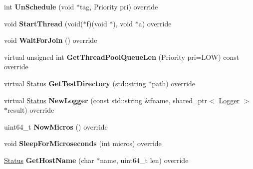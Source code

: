 \begin{DoxyCompactItemize}
\item 
int {\bfseries Un\+Schedule} (void $\ast$tag, Priority pri) override\hypertarget{classrocksdb_1_1EnvWrapper_ae8d7a993c3d59951738942283241b76f}{}\label{classrocksdb_1_1EnvWrapper_ae8d7a993c3d59951738942283241b76f}

\item 
void {\bfseries Start\+Thread} (void($\ast$f)(void $\ast$), void $\ast$a) override\hypertarget{classrocksdb_1_1EnvWrapper_aca39b00f12a10b25a29cf80bc877bcd7}{}\label{classrocksdb_1_1EnvWrapper_aca39b00f12a10b25a29cf80bc877bcd7}

\item 
void {\bfseries Wait\+For\+Join} () override\hypertarget{classrocksdb_1_1EnvWrapper_aeb73bcae1e862c28c1facf89c6bdc004}{}\label{classrocksdb_1_1EnvWrapper_aeb73bcae1e862c28c1facf89c6bdc004}

\item 
virtual unsigned int {\bfseries Get\+Thread\+Pool\+Queue\+Len} (Priority pri=L\+OW) const override\hypertarget{classrocksdb_1_1EnvWrapper_ad793f330cd75416daac2942f27dbbaa4}{}\label{classrocksdb_1_1EnvWrapper_ad793f330cd75416daac2942f27dbbaa4}

\item 
virtual \hyperlink{classrocksdb_1_1Status}{Status} {\bfseries Get\+Test\+Directory} (std\+::string $\ast$path) override\hypertarget{classrocksdb_1_1EnvWrapper_a317ac22205c71a9149ac281a2099eea8}{}\label{classrocksdb_1_1EnvWrapper_a317ac22205c71a9149ac281a2099eea8}

\item 
virtual \hyperlink{classrocksdb_1_1Status}{Status} {\bfseries New\+Logger} (const std\+::string \&fname, shared\+\_\+ptr$<$ \hyperlink{classrocksdb_1_1Logger}{Logger} $>$ $\ast$result) override\hypertarget{classrocksdb_1_1EnvWrapper_a2980b8dc1cd6861ab3ed58e57b6b7de1}{}\label{classrocksdb_1_1EnvWrapper_a2980b8dc1cd6861ab3ed58e57b6b7de1}

\item 
uint64\+\_\+t {\bfseries Now\+Micros} () override\hypertarget{classrocksdb_1_1EnvWrapper_aa37120924c92abc8dcc877b030e2e85e}{}\label{classrocksdb_1_1EnvWrapper_aa37120924c92abc8dcc877b030e2e85e}

\item 
void {\bfseries Sleep\+For\+Microseconds} (int micros) override\hypertarget{classrocksdb_1_1EnvWrapper_aead93103f08a912aa82ae4d67a4d58eb}{}\label{classrocksdb_1_1EnvWrapper_aead93103f08a912aa82ae4d67a4d58eb}

\item 
\hyperlink{classrocksdb_1_1Status}{Status} {\bfseries Get\+Host\+Name} (char $\ast$name, uint64\+\_\+t len) override\hypertarget{classrocksdb_1_1EnvWrapper_a0351d4fc6a66eb8131ccd8c1874dbb8f}{}\label{classrocksdb_1_1EnvWrapper_a0351d4fc6a66eb8131ccd8c1874dbb8f}


\end{DoxyCompactItemize}
